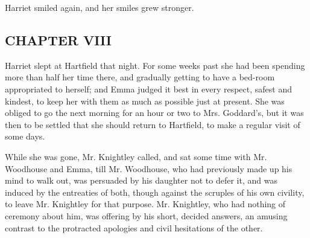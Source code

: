 
Harriet smiled again, and her smiles grew stronger.

\subsection[chapter-viii]{\useURL[url8][][][]\from[url8]CHAPTER VIII}

Harriet slept at Hartfield that night. For some weeks past she had been spending more than half her time there, and gradually getting to have a bed-room appropriated to herself; and Emma judged it best in every respect, safest and kindest, to keep her with them as much as possible just at present. She was obliged to go the next morning for an hour or two to Mrs. Goddard's, but it was then to be settled that she should return to Hartfield, to make a regular visit of some days.

While she was gone, Mr. Knightley called, and sat some time with Mr. Woodhouse and Emma, till Mr. Woodhouse, who had previously made up his mind to walk out, was persuaded by his daughter not to defer it, and was induced by the entreaties of both, though against the scruples of his own civility, to leave Mr. Knightley for that purpose. Mr. Knightley, who had nothing of ceremony about him, was offering by his short, decided answers, an amusing contrast to the protracted apologies and civil hesitations of the other.




